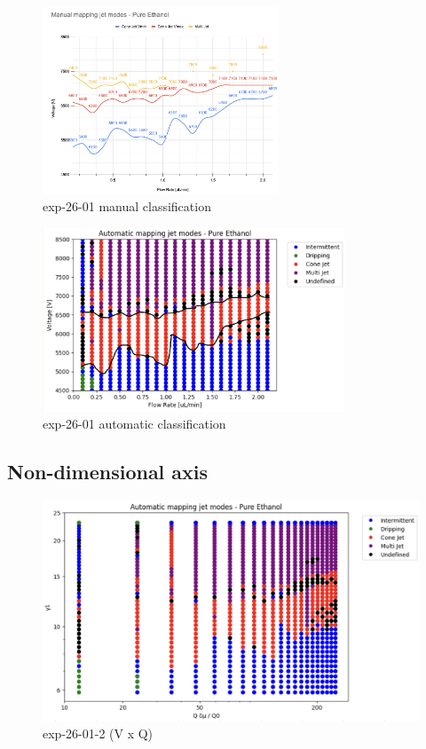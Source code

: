         \begin{multicols}{2}


            \begin{figure}[H]
                \center
                \includegraphics[width=7cm]{Figuras/report4/map7-manual.png}
                \caption{ exp-26-01 manual classification}
            \end{figure}

            \begin{figure}[H]
                \center
                \includegraphics[width=9cm]{Figuras/report4/map7-automatic-line.png}
                \caption{ exp-26-01 automatic classification}
            \end{figure}


        \end{multicols}

        \subsection{Non-dimensional axis}

            \begin{figure}[H]
                \center
                \includegraphics[width=12cm]{Figuras/19:03/non-dimensional-1.png}
                \caption{ exp-26-01-2 (V x Q)}
            \end{figure}

